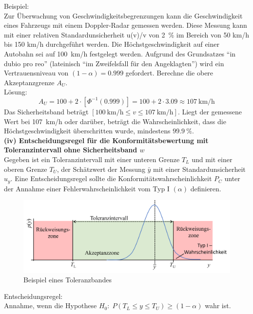Beispiel: \\
Zur Überwachung von Geschwindigkeitsbegrenzungen kann die Geschwindigkeit eines Fahrzeugs mit einem Doppler-Radar gemessen werden. Diese Messung kann mit einer relativen Standardunsicherheit u(v)/v von 2~\% im Bereich von 50 km/h bis 150 km/h durchgeführt werden.
Die Höchstgeschwindigkeit auf einer Autobahn sei auf 100~km/h festgelegt werden. Aufgrund des Grundsatzes ``in dubio pro reo'' (lateinisch ``im Zweifelsfall für den Angeklagten'') wird ein Vertrauensniveau von $(1- \alpha) = 0.999$ gefordert. Berechne die obere Akzeptanzgrenze $A_U$. \\
Lösung:\\[-1ex]
\[
A_U = 100 + 2\cdot [\Phi^{-1}(0.999)] = 100 + 2\cdot 3.09 \approx 107~ \mathrm{km/h} 
\]
Das Sicherheitsband beträgt $[100~\mathrm{km/h} \le v \le 107~\mathrm{km/h}]$. Liegt der gemessene Wert bei 107~km/h oder darüber, beträgt die Wahrscheinlichkeit, dass die Höchstgeschwindigkeit überschritten wurde, mindestens $99.9~\%$. \\
\textbf{(iv) Entscheidungsregel für die Konformitätsbewertung mit Toleranzintervall ohne Sicherheitsband $w$} \\
Gegeben ist ein Toleranzintervall mit einer unteren Grenze $T_L$ und mit einer oberen Grenze $T_U$, der Schätzwert der Messung $\bar y$ mit einer Standardunsicherheit $u_y$. Eine Entscheidungsregel sollte die Konformitätswahrscheinlichkeit $P_C$ unter der Annahme einer Fehlerwahrscheinlichkeit vom Typ I $(\alpha)$ definieren.
\begin{figure}[!htb]
	\begin{center}
		\includegraphics[width=140mm]{06_vorlesung/media/Toleranzband_Beispiel.png}
		\caption{Beispiel eines Toleranzbandes}
		\label{fig:Beispiel_Toleranzintervall}
	\end{center}
\end{figure}
Entscheidungsregel: \\
\hspace*{1em}Annahme, wenn die Hypothese 
$H_0: \; P(T_L \le y \le T_U) \ge (1 - \alpha)$  wahr ist. \newline
